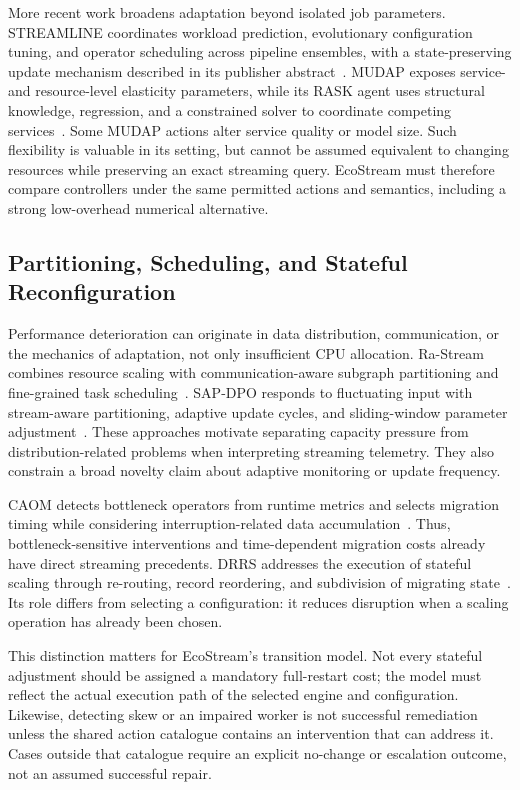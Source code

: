 More recent work broadens adaptation beyond isolated job parameters. STREAMLINE coordinates workload prediction, evolutionary configuration tuning, and operator scheduling across pipeline ensembles, with a state-preserving update mechanism described in its publisher abstract~\cite{pedratscher2025streamline}. MUDAP exposes service- and resource-level elasticity parameters, while its RASK agent uses structural knowledge, regression, and a constrained solver to coordinate competing services~\cite{sedlak2026mudap}. Some MUDAP actions alter service quality or model size. Such flexibility is valuable in its setting, but cannot be assumed equivalent to changing resources while preserving an exact streaming query. EcoStream must therefore compare controllers under the same permitted actions and semantics, including a strong low-overhead numerical alternative.

\subsection{Partitioning, Scheduling, and Stateful Reconfiguration}
Performance deterioration can originate in data distribution, communication, or the mechanics of adaptation, not only insufficient CPU allocation. Ra-Stream combines resource scaling with communication-aware subgraph partitioning and fine-grained task scheduling~\cite{fan2026rastream}. SAP-DPO responds to fluctuating input with stream-aware partitioning, adaptive update cycles, and sliding-window parameter adjustment~\cite{ren2026sapdpo}. These approaches motivate separating capacity pressure from distribution-related problems when interpreting streaming telemetry. They also constrain a broad novelty claim about adaptive monitoring or update frequency.

CAOM detects bottleneck operators from runtime metrics and selects migration timing while considering interruption-related data accumulation~\cite{tan2025caom}. Thus, bottleneck-sensitive interventions and time-dependent migration costs already have direct streaming precedents. DRRS addresses the execution of stateful scaling through re-routing, record reordering, and subdivision of migrating state~\cite{qing2025drrs}. Its role differs from selecting a configuration: it reduces disruption when a scaling operation has already been chosen.

This distinction matters for EcoStream's transition model. Not every stateful adjustment should be assigned a mandatory full-restart cost; the model must reflect the actual execution path of the selected engine and configuration. Likewise, detecting skew or an impaired worker is not successful remediation unless the shared action catalogue contains an intervention that can address it. Cases outside that catalogue require an explicit no-change or escalation outcome, not an assumed successful repair.

